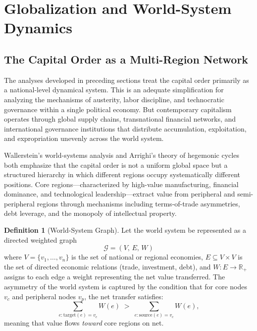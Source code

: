 \documentclass[12pt,a4paper]{article}
\theoremstyle{definition}
\newtheorem{definition}{Definition}[section]
\theoremstyle{remark}
\begin{document}
\section{Globalization and World-System Dynamics}
\label{sec:worldsystem}

\subsection{The Capital Order as a Multi-Region Network}

The analyses developed in preceding sections treat the capital order primarily as a national-level dynamical system. This is an adequate simplification for analyzing the mechanisms of austerity, labor discipline, and technocratic governance within a single political economy. But contemporary capitalism operates through global supply chains, transnational financial networks, and international governance institutions that distribute accumulation, exploitation, and expropriation unevenly across the world system.

Wallerstein's world-systems analysis and Arrighi's theory of hegemonic cycles both emphasize that the capital order is not a uniform global space but a structured hierarchy in which different regions occupy systematically different positions. Core regions---characterized by high-value manufacturing, financial dominance, and technological leadership---extract value from peripheral and semi-peripheral regions through mechanisms including terms-of-trade asymmetries, debt leverage, and the monopoly of intellectual property.

\begin{definition}[World-System Graph]
Let the world system be represented as a directed weighted graph
\begin{equation}
  \mathcal{G} = (V,\, E,\, W)
\end{equation}
where $V = \{v_1, \ldots, v_n\}$ is the set of national or regional economies, $E \subseteq V \times V$ is the set of directed economic relations (trade, investment, debt), and $W : E \to \mathbb{R}_+$ assigns to each edge a weight representing the net value transferred. The asymmetry of the world system is captured by the condition that for core nodes $v_c$ and peripheral nodes $v_p$, the net transfer satisfies:
\begin{equation}
  \sum_{e : \text{target}(e)=v_c} W(e) \;>\; \sum_{e : \text{source}(e)=v_c} W(e),
\end{equation}
meaning that value flows \emph{toward} core regions on net.
\end{definition}
\end{document}
